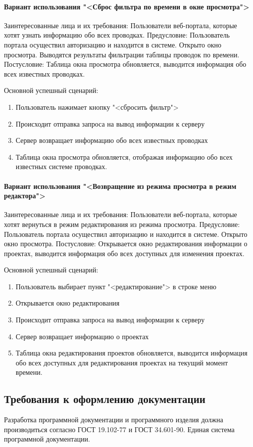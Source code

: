 \paragraph{Вариант использования "<Сброс фильтра по времени в окне просмотра">}
Заинтересованные лица и их требования: Пользователи веб-портала, которые хотят узнать информацию обо всех проводках.
Предусловие: Пользователь портала осуществил авторизацию и находится в системе. Открыто окно просмотра. Выводятся результаты фильтрации таблицы проводок по времени.
Постусловие: Таблица окна просмотра обновляется, выводится информация обо всех известных проводках.

Основной успешный сценарий:
\begin{enumerate}
	\item Пользователь нажимает кнопку "<сбросить фильтр">
	\item Происходит отправка запроса на вывод информации к серверу 
	\item Сервер возвращает информацию обо всех известных проводках
	\item Таблица окна просмотра обновляется, отображая информацию обо всех известных системе проводках.
\end{enumerate}

\paragraph{Вариант использования "<Возвращение из режима просмотра в режим редактора">}
Заинтересованные лица и их требования: Пользователи веб-портала, которые хотят вернуться в режим редактирования из режима просмотра.
Предусловие: Пользователь портала осуществил авторизацию и находится в системе. Открыто окно просмотра.
Постусловие: Открывается окно редактирования информации о проектах, выводится информация обо всех доступных для изменения проектах.

Основной успешный сценарий:
\begin{enumerate}
	\item Пользователь выбирает пункт "<редактирование"> в строке меню
	\item Открывается окно редактирования
	\item Происходит отправка запроса на вывод информации к серверу 
	\item Сервер возвращает информацию о проектах
	\item Таблица окна редактирования проектов обновляется, выводится информация обо всех доступных для редактирования проектах на текущий момент времени.
\end{enumerate}

\subsection{Требования к оформлению документации}

Разработка программной документации и программного изделия должна производиться согласно ГОСТ 19.102-77 и ГОСТ 34.601-90. Единая система программной документации.
